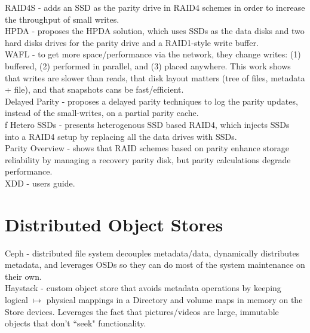 \documentclass{article}
\begin{document}
\noindent\cite{wacha:venue2010-RAID4s} RAID4S - adds an SSD as the parity drive in RAID4 schemes in order to increase the throughput of small writes.\\

\noindent\cite{mao:ipsps2010-HPDA} HPDA - proposes the HPDA solution, which uses SSDs as the data disks and two hard disks drives for the parity drive and a RAID1-style write buffer.\\

\noindent\cite{hitz:wtec1994-WAFL} WAFL - to get more space/performance via the network, they change  writes: (1) buffered, (2) performed in parallel, and (3) placed anywhere. This work shows that writes are slower than reads, that disk layout matters (tree of files, metadata + file), and that snapshots cans be fast/efficient.\\

\noindent\cite{im:msst2010-delayedparity} Delayed Parity - proposes a delayed parity techniques to log the parity updates, instead of the small-writes, on a partial parity cache.\\
f
\noindent\cite{park:cit2009-ssdRAID} Hetero SSDs - presents heterogenous SSD based RAID4, which injects SSDs into a RAID4 setup by replacing all the data drives with SSDs.\\

\noindent\cite{chen:acm1994-RAID} Parity Overview - shows that RAID schemes based on parity enhance storage reliability by managing a recovery parity disk, but parity calculations degrade performance.\\

\noindent\cite{XDD} XDD - users guide.

\section{Distributed Object Stores}
\noindent\cite{weil:osdi2006-ceph} Ceph - distributed file system decouples metadata/data, dynamically distributes metadata, and leverages OSDs so they can do most of the system maintenance on their own.\\

\noindent\cite{beaver:osdi2010-haystack} Haystack - custom object store that avoids metadata operations by keeping logical \(\mapsto\) physical mappings in a Directory and volume maps in memory on the Store devices. Leverages the fact that pictures/videos are large, immutable objects that don't ``seek" functionality.\\
\end{document}
